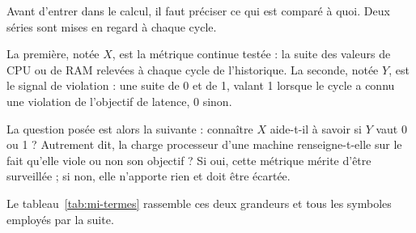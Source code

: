 Avant d'entrer dans le calcul, il faut préciser ce qui est comparé à quoi. Deux séries sont mises en regard à chaque cycle.

La première, notée $X$, est la métrique continue testée : la suite des valeurs de CPU ou de RAM relevées à chaque cycle de l'historique. La seconde, notée $Y$, est le signal de violation : une suite de 0 et de 1, valant 1 lorsque le cycle a connu une violation de l'objectif de latence, 0 sinon.

La question posée est alors la suivante : connaître $X$ aide-t-il à savoir si $Y$ vaut 0 ou 1 ? Autrement dit, la charge processeur d'une machine renseigne-t-elle sur le fait qu'elle viole ou non son objectif ? Si oui, cette métrique mérite d'être surveillée ; si non, elle n'apporte rien et doit être écartée.

Le tableau~\ref{tab:mi-termes} rassemble ces deux grandeurs et tous les symboles employés par la suite.

